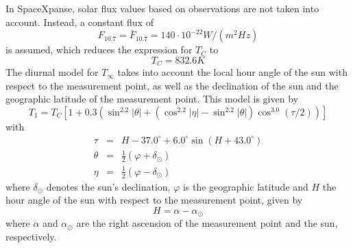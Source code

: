 \documentclass[a4paper]{article}
\begin{document}
In SpaceXpanse, solar flux values based on observations are not taken into account. Instead, a constant flux of
\begin{equation}
F_{10.7} = \bar{F}_{10.7} = 140 \cdot 10^{-22} W/(m^2 Hz)
\end{equation}
is assumed, which reduces the expression for $T_C$ to
\begin{equation}
T_C = 832.6K
\end{equation}
The diurnal model for $T_\infty$ takes into account the local hour angle of the sun with respect to the measurement point, as well as the declination of the sun and the geographic latitude of the measurement point. This model is given by
\begin{equation}
T_1 = T_C \left[ 1 + 0.3 \left( \sin^{2.2}|\theta| + (\cos^{2.2}|\eta| - \sin^{2.2}|\theta|) \cos^{3.0}(\tau/2) \right) \right]
\end{equation}
with
\begin{eqnarray}
\tau &=& H - 37.0^\circ + 6.0^\circ \sin(H+43.0^\circ) \\
\theta &=& \frac{1}{2} (\varphi + \delta_\odot ) \\
\eta &=& \frac{1}{2} (\varphi - \delta_\odot)
\end{eqnarray}
where $\delta_\odot$ denotes the sun's declination, $\varphi$ is the geographic latitude and $H$ the hour angle of the sun with respect to the measurement point, given by
\begin{equation}
H = \alpha - \alpha_\odot
\end{equation}
where $\alpha$ and $\alpha_\odot$ are the right ascension of the measurement point and the sun, respectively.
\end{document}
